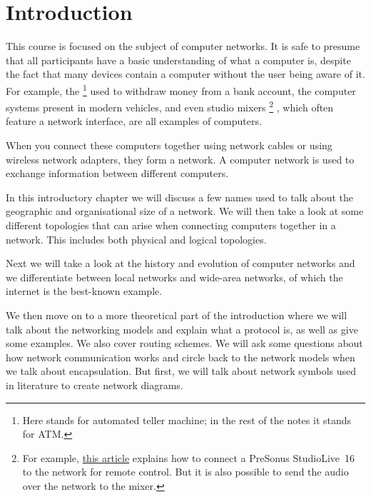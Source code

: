 \chapter{Introduction}
\label{chap:introduction}

This course is focused on the subject of computer networks.
It is safe to presume that all participants have a basic understanding of what a computer is, despite the fact that many devices contain a computer without the user being aware of it.
For example, the %
   \footnote{Here  stands for automated teller machine; in the rest of the notes it stands for \acl{ATM}.}
used to withdraw money from a bank account, the computer systems present in modern vehicles, and even studio mixers%
   \footnote{For example, \href{https://www.presonus.com/learn/technical-articles/How-To-Network-Studiolive-Digital-Mixers-for-Remote-Control}{this article} explains how to connect a PreSonus Studio\-Live~16 to the network for remote control. But it is also possible to send the audio over the network to the mixer.}
, which often feature a network interface, are all examples of computers.
    
When you connect these computers together using network cables or using wireless network adapters, they form a network.
A computer network is used to exchange information between different computers.

In this introductory chapter we will discuss a few names used to talk about the geographic and organisational size of a network.
We will then take a look at some different topologies that can arise when connecting computers together in a network.
This includes both physical and logical topologies.

Next we will take a look at the history and evolution of computer networks and we differentiate between 
local networks and wide-area networks, of which the internet is the best-known example.

We then move on to a more theoretical part of the introduction where we will talk about the networking models and explain what a protocol is, as well as give some examples.
We also cover routing schemes.
We will ask some questions about how network communication works and circle back to the network models when we talk about encapsulation.
But first, we will talk about network symbols used in literature to create network diagrams.



